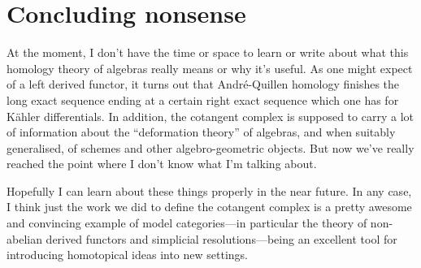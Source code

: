 
\section*{Concluding nonsense}

At the moment, I don't have the time or space to learn or write about
what this homology theory of algebras really means or why it's
useful. As one might expect of a left derived functor, it turns out
that Andr\'e-Quillen homology finishes the long exact sequence ending
at a certain right exact sequence which one has for K\"ahler
differentials. In addition, the cotangent complex is supposed to carry
a lot of information about the ``deformation theory'' of algebras, and
when suitably generalised, of schemes and other algebro-geometric
objects. But now we've really reached the point where I don't know
what I'm talking about.

Hopefully I can learn about these things properly in the near
future. In any case, I think just the work we did to define the
cotangent complex is a pretty awesome and convincing example of model
categories---in particular the theory of non-abelian derived functors
and simplicial resolutions---being an excellent tool for introducing
homotopical ideas into new settings.


\nocite{iyengar-cotangent}




